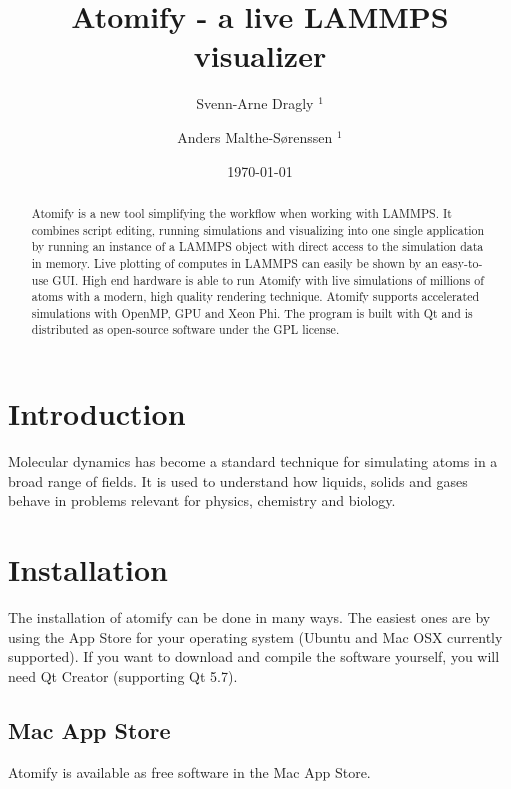 \documentclass[aps,pre,twocolumn,letterpaper,floatfix,showpacs]{revtex4}
\begin{document}
\title{Atomify - a live LAMMPS visualizer}
\author{Svenn-Arne Dragly $^{1}$} 
\author{Anders Malthe-S\o renssen $^1$}
\date{\today} 

\begin{abstract} 
Atomify is a new tool simplifying the workflow when working with LAMMPS. It combines script editing, running simulations and visualizing into one single application by running an instance of a LAMMPS object with direct access to the simulation data in memory. Live plotting of computes in LAMMPS can easily be shown by an easy-to-use GUI. High end hardware is able to run Atomify with live simulations of millions of atoms with a modern, high quality rendering technique. Atomify supports accelerated simulations with OpenMP, GPU and Xeon Phi. The program is built with Qt and is distributed as open-source software under the GPL license. 
\end{abstract} 
 
\maketitle
 
\section{Introduction}
Molecular dynamics has become a standard technique for simulating atoms in a broad range of fields. It is used to understand how liquids, solids and gases behave in problems relevant for physics, chemistry and biology. 

\section{Installation}
The installation of atomify can be done in many ways. The easiest ones are by using the App Store for your operating system (Ubuntu and Mac OSX currently supported). If you want to download and compile the software yourself, you will need Qt Creator (supporting Qt 5.7).
\subsection{Mac App Store}
Atomify is available as free software in the Mac App Store. 
\end{document}
